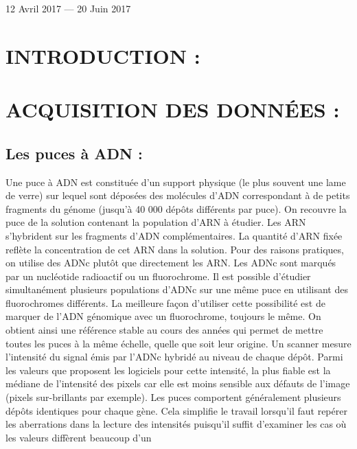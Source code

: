 \documentclass[a4paper,10pt]{article}
\begin{document}
\begin{titlepage}
\begin{sffamily}
\begin{center}
    \vfill

    {\large 12 Avril 2017 — 20 Juin 2017}

  \end{center}
  \end{sffamily}
\end{titlepage}
\newpage
\tableofcontents
\newpage
\section{INTRODUCTION :}
\section{ACQUISITION DES DONN\'{E}ES :}
\subsection{Les puces à ADN :}
  Une puce à ADN est constituée d'un support physique (le plus
  souvent une lame de verre) sur lequel sont déposées des molécules
  d'ADN correspondant à de petits fragments du génome (jusqu'à 40 000
  dépôts différents par puce). On recouvre la puce
  de la solution contenant la population d'ARN à étudier. Les ARN
  s'hybrident sur les fragments d'ADN complémentaires. La quantité d'ARN
  fixée reflète la concentration de cet ARN dans la solution.
  \newline
 Pour des raisons pratiques, on utilise des ADNc plutôt que directement
  les ARN. Les ADNc sont marqués par un nucléotide radioactif ou
  un fluorochrome. Il est possible d'étudier simultanément plusieurs
  populations d'ADNc sur une même puce en utilisant des fluorochromes différents.
  La meilleure façon d'utiliser cette possibilité est de marquer
  de l'ADN génomique avec un fluorochrome, toujours le même. On
  obtient ainsi une référence stable au cours des années
  qui permet de mettre toutes les puces à la même échelle,
  quelle que soit leur origine. 
  \newline
  Un scanner mesure l'intensité du signal émis par l'ADNc hybridé au niveau de chaque dépôt. Parmi les valeurs que proposent les
  logiciels pour cette intensité, la plus fiable est la médiane de l'intensité des pixels car elle est moins sensible aux défauts de
  l'image (pixels sur-brillants par exemple). 
  \newline
  Les puces comportent généralement plusieurs dépôts identiques pour chaque gène. Cela simplifie le travail lorsqu'il faut
  repérer les aberrations dans la lecture des intensités puisqu'il suffit d'examiner les cas où les valeurs diffèrent beaucoup d'un
\end{document}
